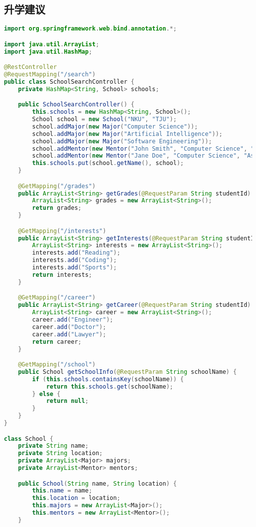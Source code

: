 \documentclass[UTF8]{ctexart}
\begin{document}
    \subsection{升学建议}
    \begin{lstlisting}[language=java]
        import org.springframework.web.bind.annotation.*;

import java.util.ArrayList;
import java.util.HashMap;

@RestController
@RequestMapping("/search")
public class SchoolSearchController {
    private HashMap<String, School> schools;

    public SchoolSearchController() {
        this.schools = new HashMap<String, School>();
        School school = new School("NKU", "TJU");
        school.addMajor(new Major("Computer Science"));
        school.addMajor(new Major("Artificial Intelligence"));
        school.addMajor(new Major("Software Engineering"));
        school.addMentor(new Mentor("John Smith", "Computer Science", "Professor"));
        school.addMentor(new Mentor("Jane Doe", "Computer Science", "Associate Professor"));
        this.schools.put(school.getName(), school);
    }

    @GetMapping("/grades")
    public ArrayList<String> getGrades(@RequestParam String studentId) {
        ArrayList<String> grades = new ArrayList<String>();
        return grades;
    }

    @GetMapping("/interests")
    public ArrayList<String> getInterests(@RequestParam String studentId) {
        ArrayList<String> interests = new ArrayList<String>();
        interests.add("Reading");
        interests.add("Coding");
        interests.add("Sports");
        return interests;
    }

    @GetMapping("/career")
    public ArrayList<String> getCareer(@RequestParam String studentId) {
        ArrayList<String> career = new ArrayList<String>();
        career.add("Engineer");
        career.add("Doctor");
        career.add("Lawyer");
        return career;
    }

    @GetMapping("/school")
    public School getSchoolInfo(@RequestParam String schoolName) {
        if (this.schools.containsKey(schoolName)) {
            return this.schools.get(schoolName);
        } else {
            return null;
        }
    }
}

class School {
    private String name;
    private String location;
    private ArrayList<Major> majors;
    private ArrayList<Mentor> mentors;

    public School(String name, String location) {
        this.name = name;
        this.location = location;
        this.majors = new ArrayList<Major>();
        this.mentors = new ArrayList<Mentor>();
    }


\end{lstlisting}
\end{document}
